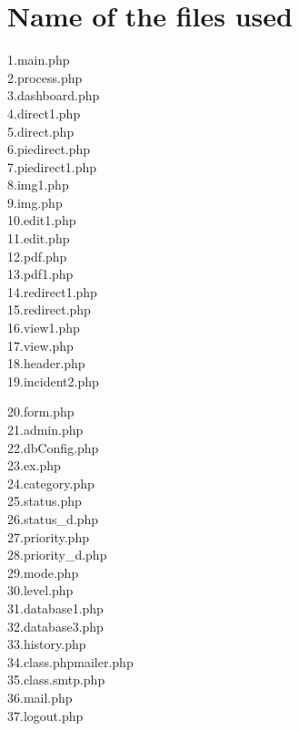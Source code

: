 \documentclass{article}
\begin{document}
\section{Name of the files used }
\begin{minipage}[t]{0.5\textwidth}
1.main.php     \\
2.process.php\\
3.dashboard.php \\        
4.direct1.php\\
5.direct.php\\
6.piedirect.php\\
7.piedirect1.php \\
8.img1.php\\
9.img.php \\
10.edit1.php\\
11.edit.php \\
12.pdf.php\\
13.pdf1.php \\
14.redirect1.php\\
15.redirect.php \\
16.view1.php\\
17.view.php \\
18.header.php\\
19.incident2.php \\\end{minipage}\begin{minipage}[t]{0.5\textwidth}
20.form.php\\
21.admin.php \\
22.dbConfig.php\\
23.ex.php \\
24.category.php\\
25.status.php\\
26.status\_d.php\\
27.priority.php\\
28.priority\_d.php\\
29.mode.php \\
30.level.php\\
31.database1.php\\
32.database3.php\\
33.history.php\\
34.class.phpmailer.php\\
35.class.smtp.php\\
36.mail.php\\
37.logout.php\end{minipage}
\end{document}
